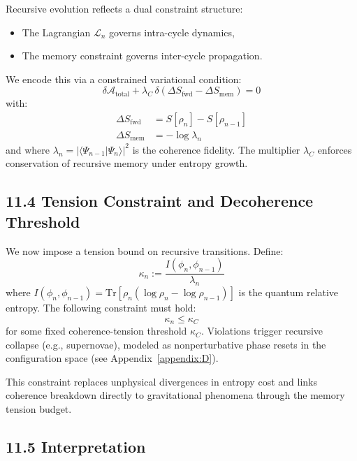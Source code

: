 Recursive evolution reflects a dual constraint structure:
\begin{itemize}
    \item The Lagrangian \( \mathcal{L}_n \) governs intra-cycle dynamics,
    \item The memory constraint governs inter-cycle propagation.
\end{itemize}
We encode this via a constrained variational condition:
\begin{equation}
\delta \mathcal{A}_{\text{total}} + \lambda_C \, \delta\left( \Delta S_{\text{fwd}} - \Delta S_{\text{mem}} \right) = 0
\end{equation}
with:
\begin{align*}
\Delta S_{\text{fwd}} &= S[\rho_n] - S[\rho_{n-1}] \\
\Delta S_{\text{mem}} &= -\log \lambda_n
\end{align*}
and where \( \lambda_n = |\langle \Psi_{n-1} | \Psi_n \rangle|^2 \) is the coherence fidelity. The multiplier \( \lambda_C \) enforces conservation of recursive memory under entropy growth.

\subsection{11.4 Tension Constraint and Decoherence Threshold}

We now impose a tension bound on recursive transitions. Define:
\begin{equation}
\kappa_n := \frac{I(\phi_n, \phi_{n-1})}{\lambda_n}
\end{equation}
where \( I(\phi_n, \phi_{n-1}) = \mathrm{Tr}[\rho_n (\log \rho_n - \log \rho_{n-1})] \) is the quantum relative entropy. The following constraint must hold:
\begin{equation}
\kappa_n \leq \kappa_C
\end{equation}
for some fixed coherence-tension threshold \( \kappa_C \). Violations trigger recursive collapse (e.g., supernovae), modeled as nonperturbative phase resets in the configuration space (see Appendix~\ref{appendix:D}).

This constraint replaces unphysical divergences in entropy cost and links coherence breakdown directly to gravitational phenomena through the memory tension budget.

\subsection{11.5 Interpretation}

